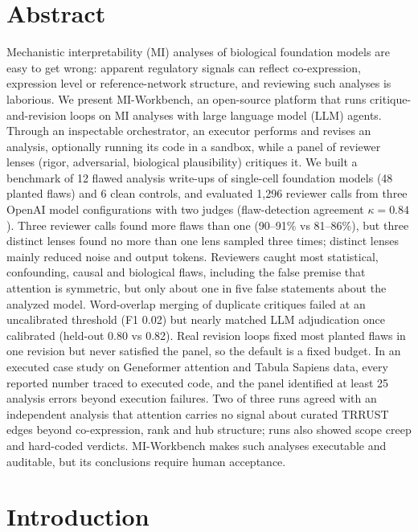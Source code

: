 \documentclass[10pt,letterpaper]{article}
\begin{document}
\section*{Abstract}
Mechanistic interpretability (MI) analyses of biological foundation models are easy to get wrong: apparent regulatory signals can reflect co-expression, expression level or reference-network structure, and reviewing such analyses is laborious. We present MI-Workbench, an open-source platform that runs critique-and-revision loops on MI analyses with large language model (LLM) agents. Through an inspectable orchestrator, an executor performs and revises an analysis, optionally running its code in a sandbox, while a panel of reviewer lenses (rigor, adversarial, biological plausibility) critiques it. We built a benchmark of 12 flawed analysis write-ups of single-cell foundation models (48 planted flaws) and 6 clean controls, and evaluated 1,296 reviewer calls from three OpenAI model configurations with two judges (flaw-detection agreement $\kappa=0.84$). Three reviewer calls found more flaws than one (90--91\% vs 81--86\%), but three distinct lenses found no more than one lens sampled three times; distinct lenses mainly reduced noise and output tokens. Reviewers caught most statistical, confounding, causal and biological flaws, including the false premise that attention is symmetric, but only about one in five false statements about the analyzed model. Word-overlap merging of duplicate critiques failed at an uncalibrated threshold (F1 0.02) but nearly matched LLM adjudication once calibrated (held-out 0.80 vs 0.82). Real revision loops fixed most planted flaws in one revision but never satisfied the panel, so the default is a fixed budget. In an executed case study on Geneformer attention and Tabula Sapiens data, every reported number traced to executed code, and the panel identified at least 25 analysis errors beyond execution failures. Two of three runs agreed with an independent analysis that attention carries no signal about curated TRRUST edges beyond co-expression, rank and hub structure; runs also showed scope creep and hard-coded verdicts. MI-Workbench makes such analyses executable and auditable, but its conclusions require human acceptance.



\linenumbers

\section*{Introduction}
\end{document}
